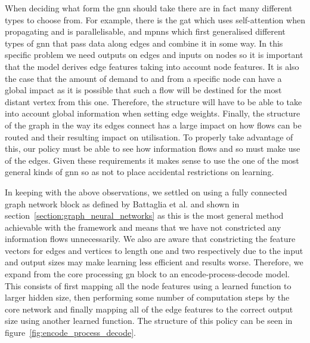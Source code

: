 When deciding what form the \ac{gnn} should take there are in fact many different types to choose from. For example, there is the \ac{gat}\cite{velivckovic2017graph} which uses self-attention when propagating and is parallelisable, and \acp{mpnn}\cite{gilmer2017neural} which first generalised different types of \ac{gnn} that pass data along edges and combine it in some way. In this specific problem we need outputs on edges and inputs on nodes so it is important that the model derives edge features taking into account node features. It is also the case that the amount of demand to and from a specific node can have a global impact as it is possible that such a flow will be destined for the most distant vertex from this one. Therefore, the structure will have to be able to take into account global information when setting edge weights. Finally, the structure of the graph in the way its edges connect has a large impact on how flows can be routed and their resulting impact on utilisation. To properly take advantage of this, our policy must be able to see how information flows and so must make use of the edges. Given these requirements it makes sense to use the one of the most general kinds of \ac{gnn} so as not to place accidental restrictions on learning.

In keeping with the above observations, we settled on using a fully connected graph network block as defined by Battaglia et al.\cite{battaglia2018relational} and shown in section~\ref{section:graph_neural_networks} as this is the most general method achievable with the framework and means that we have not constricted any information flows unnecessarily. We also are aware that constricting the feature vectors for edges and vertices to length one and two respectively due to the input and output sizes may make learning less efficient and results worse. Therefore, we expand from the core processing \ac{gn} block to an encode-process-decode model. This consists of first mapping all the node features using a learned function to larger hidden size, then performing some number of computation steps by the core network and finally mapping all of the edge features to the correct output size using another learned function. The structure of this policy can be seen in figure~\ref{fig:encode_process_decode}.

